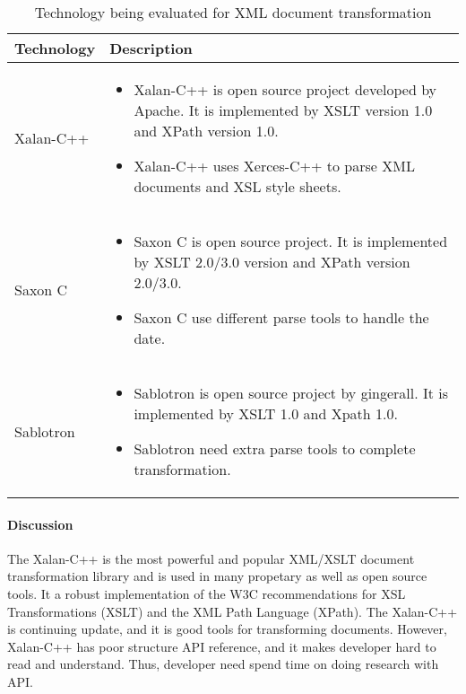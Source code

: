\begin{table}[H]
  \begin{center}
    \begin{tabular}{ | l | p{10cm} |}
      \hline
      Technology & Description  \\ \hline

      Xalan-C++ \cite{xalan} &
      \begin{itemize}
        \item Xalan-C++ is open source project developed by Apache. It is implemented by XSLT version 1.0 and XPath version 1.0.
        \item Xalan-C++ uses Xerces-C++ to parse XML documents and XSL style sheets.
      \end{itemize}\\ \hline

      Saxon C \cite{Saxon_c} &
      \begin{itemize}
        \item Saxon C is open source project. It is implemented by XSLT 2.0/3.0 version and XPath version 2.0/3.0.
        \item Saxon C use different parse tools to handle the date.
      \end{itemize}\\ \hline

      Sablotron \cite{Sablotron_intro} &
      \begin{itemize}
        \item Sablotron is open source project by gingerall. It is implemented by XSLT 1.0 and Xpath 1.0.
      \item Sablotron need extra parse tools to complete transformation.
      \end{itemize}\\ \hline
    \end{tabular}
  \end{center}
  \caption{Technology being evaluated for XML document transformation}
\end{table}

\paragraph{Discussion}

The Xalan-C++ is the most powerful and popular XML/XSLT document transformation library and is used in many propetary as well as open source tools.
It a robust implementation of the W3C recommendations for XSL Transformations (XSLT) and the XML Path Language (XPath).
The Xalan-C++ is continuing update, and it is good tools for transforming documents.
However, Xalan-C++ has poor structure API reference, and it makes developer hard to read and understand.
Thus, developer need spend time on doing research with API.

